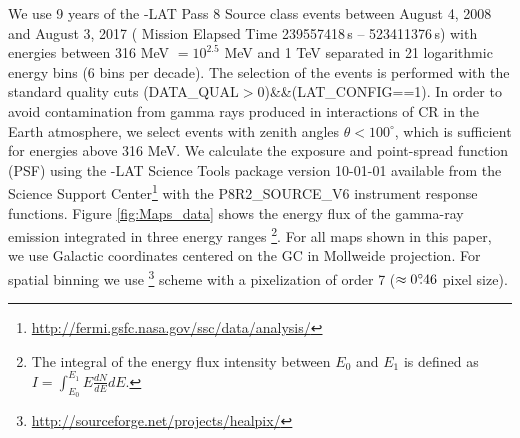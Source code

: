 We use 9 years of the \Fermi-LAT Pass 8 Source class events
between August 4, 2008  and August 3, 2017 ({\Fermi} Mission Elapsed Time 239557418\,s -- 523411376\,s)
with energies between 316 MeV $ = 10^{2.5}$ MeV
and 1 TeV separated in 21 logarithmic energy bins (6 bins per decade).
The selection of the events is performed with the standard quality cuts (DATA\_QUAL$>$0)\&\&(LAT\_CONFIG==1).
In order to avoid contamination from gamma rays produced in interactions of CR in the Earth atmosphere, 
we select events with zenith angles $\theta < 100^{\circ}$,
which is sufficient for energies above 316 MeV.
We calculate the exposure and point-spread function (PSF) using the {\Fermi}-LAT Science Tools package version 
10-01-01 available from the {\Fermi} Science Support Center\footnote{\url{http://fermi.gsfc.nasa.gov/ssc/data/analysis/}} 
with the P8R2\_SOURCE\_V6 instrument response functions.
Figure \ref{fig:Maps_data} shows the energy flux of the gamma-ray emission
integrated in three energy ranges%
\footnote{The integral of the energy flux intensity between $E_0$ and $E_1$ is defined as
$I = \int_{E_0}^{E_1} E \frac{dN}{dE} dE.$}.
For all maps shown in this paper, we use Galactic coordinates centered on the GC in Mollweide projection. %
For spatial binning we use \Healpix\footnote{\url{http://sourceforge.net/projects/healpix/}} \citep{2005ApJ...622..759G} scheme with a pixelization of order 7  
($\approx 0^\circ\!\!.46$ pixel size). 

